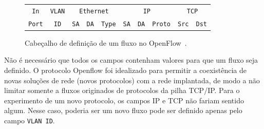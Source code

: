 \documentclass[	12pt, Times, openright, twoside, a4paper, english, brazil]{abntex2}
\begin{document}
\begin{figure}[ht]
    \centering
    \begin{tabular}{|c|c|c|c|c|c|c|c|c|c|}
    \hline
        \texttt{In}     & 
        \texttt{VLAN}   &
        \multicolumn{3}{c|}{\texttt{Ethernet}}  &
        \multicolumn{3}{c|}{\texttt{IP}}        &
        \multicolumn{2}{c|}{\texttt{TCP}}       \\
    \cline{3-10}
        \texttt{Port}   &
        \texttt{ID}     & 
        \texttt{SA}     & 
        \texttt{DA}     & 
        \texttt{Type}   & 
        \texttt{SA}     & 
        \texttt{DA}     & 
        \texttt{Proto}  & 
        \texttt{Src}    &     
        \texttt{Dst}    \\
    \hline
    \end{tabular}
    \caption{Cabeçalho de definição de um fluxo no OpenFlow~\cite{OFSespec}.} 
    \label{fig:flow-header}
\end{figure}


Não é necessário que todos os campos contenham valores para que um fluxo seja definido. O protocolo Openflow foi idealizado para permitir a coexistência de novas soluções de rede (novos protocolos) com a rede implantada, de modo a não limitar somente a fluxos originados de protocolos da pilha TCP/IP. Para o experimento de um novo protocolo, os campos IP e TCP não fariam sentido algum. Nesse caso, poderia ser um novo fluxo pode ser  definido apenas pelo campo \texttt{VLAN ID}.

\end{document}
